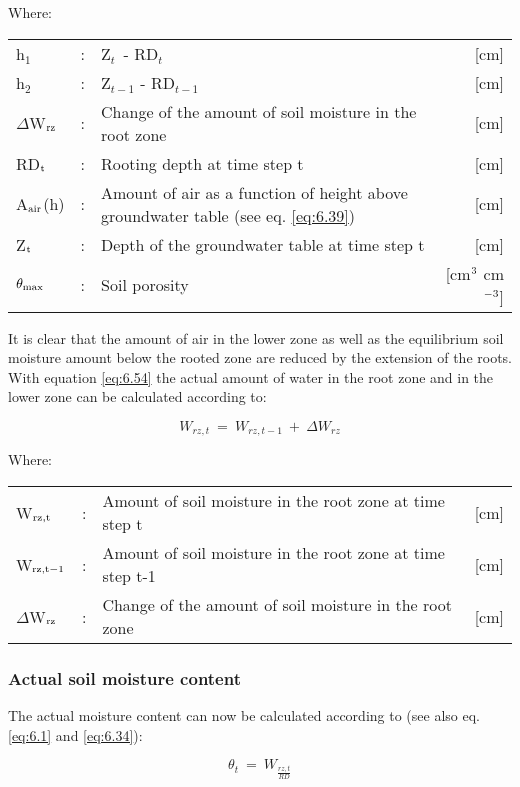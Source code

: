 Where:\\[5pt]
\begin{tabularx}{\textwidth}{llXr}
h$_{1}$ &:& Z$_{t~}$ - RD$_{t~}$ & [cm]\\
h$_{2}$ &:& Z$_{t-1}$ - RD$_{t-1}$ & [cm]\\
$\Delta$W$_{{\rm rz}}$ &:& Change of the amount of soil moisture in the root zone  & [cm]\\
RD$_{{\rm t}}$ &:& Rooting depth at time step t  & [cm]\\
A$_{{\rm air}}$(h) &:& Amount of air as a function of height above groundwater 
   table  (see eq. \ref{eq:6.39}) & [cm]\\
Z$_{{\rm t}}$ &:& Depth of the groundwater table at time step t  & [cm]\\
$\theta_{{\rm max}}$ &:& Soil porosity  & [cm$^{{\rm 3}}$ cm$^{{\rm -3}}$]\\
\end{tabularx}

It is clear that the amount of air in the lower zone as well as the equilibrium soil moisture
amount below the rooted zone are reduced by the extension of the roots. With equation
\ref{eq:6.54} the actual amount of water in the root zone and in the lower zone can be calculated
according to:

\begin{equation}
\label{eq:6.55}
W_{rz,t} ~=~ W_{rz, t-1} ~+~ \Delta W_{rz} 
\end{equation}

Where:\\[5pt]
\begin{tabularx}{\textwidth}{llXr}
W$_{{\rm rz,t}}$ &:& Amount of soil moisture in the root zone at time step t  & [cm]\\
W$_{{\rm rz,t-1}}$ &:& Amount of soil moisture in the root zone at time step t-1  & [cm]\\
$\Delta$W$_{{\rm rz}}$ &:& Change of the amount of soil moisture in the root zone  & [cm]\\
\end{tabularx}

\subsubsection{Actual soil moisture content}
The actual moisture content can now be calculated according to (see also eq. 
\ref{eq:6.1} and \ref{eq:6.34}):

\begin{equation}
\label{eq:6.56}
\theta_{t} ~=~ W _{\frac{rz, t}{RD}} 
\end{equation}

